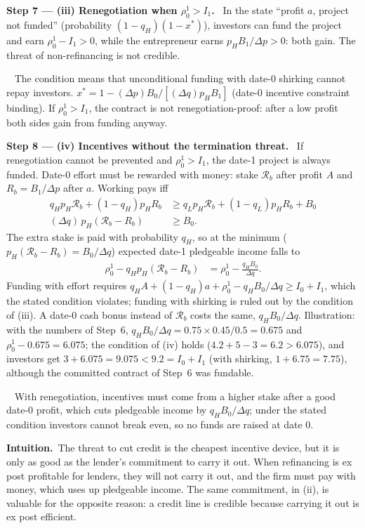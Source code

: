 \documentclass[11pt,a4paper]{article}
\newcommand{\step}[2]{\par\medskip\noindent\textbf{Step #1 --- #2.}~}
\newcommand{\intuition}{\par\medskip\noindent\textbf{Intuition.}~}
\newcommand{\answer}[1]{\par\smallskip\noindent\fbox{\textbf{Answer #1.}}~}
\begin{document}
\step{7}{(iii) Renegotiation when $\rho_0^1>I_1$} In the state ``profit $a$, project not funded'' (probability $(1-q_H)(1-x^*)$), investors can fund the project and earn $\rho_0^1-I_1>0$, while the entrepreneur earns $p_HB_1/\Delta p>0$: both gain. The threat of non-refinancing is not credible.

\answer{(iii)} The condition means that unconditional funding with date-0 shirking cannot repay investors. $x^*=1-(\Delta p)B_0/[(\Delta q)p_HB_1]$ (date-0 incentive constraint binding). If $\rho_0^1>I_1$, the contract is not renegotiation-proof: after a low profit both sides gain from funding anyway.

\step{8}{(iv) Incentives without the termination threat} If renegotiation cannot be prevented and $\rho_0^1>I_1$, the date-1 project is always funded. Date-0 effort must be rewarded with money: stake $\mathcal R_b$ after profit $A$ and $R_b=B_1/\Delta p$ after $a$. Working pays iff
\begin{align}
  q_Hp_H\mathcal R_b+(1-q_H)p_HR_b &\ge q_Lp_H\mathcal R_b+(1-q_L)p_HR_b+B_0 \nonumber\\
  (\Delta q)\,p_H(\mathcal R_b-R_b) &\ge B_0. \label{r6e7-ic0b}
\end{align}
The extra stake is paid with probability $q_H$, so at the minimum ($p_H(\mathcal R_b-R_b)=B_0/\Delta q$) expected date-1 pledgeable income falls to
\begin{align}
  \rho_0^1-q_Hp_H(\mathcal R_b-R_b) &= \rho_0^1-\frac{q_HB_0}{\Delta q}. \label{r6e7-pl}
\end{align}
Funding with effort requires $q_HA+(1-q_H)a+\rho_0^1-q_HB_0/\Delta q\ge I_0+I_1$, which the stated condition violates; funding with shirking is ruled out by the condition of (iii). A date-0 cash bonus instead of $\mathcal R_b$ costs the same, $q_HB_0/\Delta q$. Illustration: with the numbers of Step~6, $q_HB_0/\Delta q=0.75\times0.45/0.5=0.675$ and $\rho_0^1-0.675=6.075$; the condition of (iv) holds ($4.2+5-3=6.2>6.075$), and investors get $3+6.075=9.075<9.2=I_0+I_1$ (with shirking, $1+6.75=7.75$), although the committed contract of Step~6 was fundable.

\answer{(iv)} With renegotiation, incentives must come from a higher stake after a good date-0 profit, which cuts pledgeable income by $q_HB_0/\Delta q$; under the stated condition investors cannot break even, so no funds are raised at date 0.

\intuition The threat to cut credit is the cheapest incentive device, but it is only as good as the lender's commitment to carry it out. When refinancing is ex post profitable for lenders, they will not carry it out, and the firm must pay with money, which uses up pledgeable income. The same commitment, in (ii), is valuable for the opposite reason: a credit line is credible because carrying it out is ex post efficient.
\end{document}
